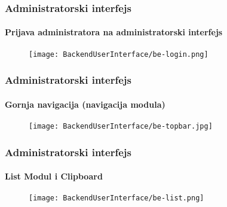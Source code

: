 
\begin{frame}[fragile]
	\frametitle{Administratorski interfejs}
	\framesubtitle{Prijava administratora na administratorski interfejs}

	\begin{figure}
		\texttt{[image: BackendUserInterface/be-login.png]}
	\end{figure}

\end{frame}


\begin{frame}[fragile]
	\frametitle{Administratorski interfejs}
	\framesubtitle{Gornja navigacija (navigacija modula)}

	\begin{figure}
		\texttt{[image: BackendUserInterface/be-topbar.jpg]}
	\end{figure}

\end{frame}


\begin{frame}[fragile]
	\frametitle{Administratorski interfejs}
	\framesubtitle{List Modul i Clipboard}

	\begin{figure}
		\texttt{[image: BackendUserInterface/be-list.png]}
	\end{figure}

\end{frame}

